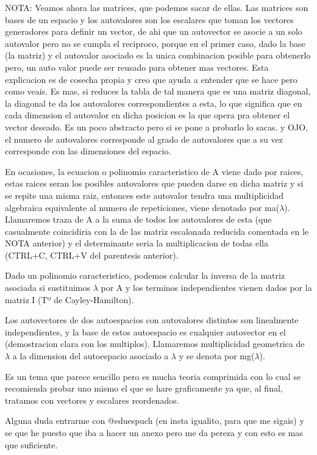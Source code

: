 \documentclass[11pt,a4paper]{article}
\begin{document}
NOTA: Veamos ahora las matrices, que podemos sacar de ellas. Las matrices son bases de un espacio y los autovalores son los escalares que toman los vectores generadores para definir un vector, de ahi que un autovector se asocie a un solo autovalor pero no se cumpla el reciproco, porque en el primer caso, dado la base (la matriz) y el autovalor asociado es la unica combinacion posible para obtenerlo pero, un auto valor puede ser reusado para obtener mas vectores. Esta explicacion es de cosecha propia y creo que ayuda a entender que se hace pero como veais. Es mas, si reduces la tabla de tal manera que es una matriz diagonal, la diagonal te da los autovalores correspondientes a esta, lo que significa que en cada dimension el autovalor en dicha posicion es la que opera pra obtener el vector deseado. Es un poco abstracto pero si se pone a probarlo lo sacas. y OJO, el numero de autovalores corresponde al grado de autovalores que a su vez corresponde con las dimensiones del espacio.

En ocasiones, la ecuacion o polinomio caracteristico de A viene dado por raices, estas raices seran los posibles autovalores que pueden darse en dicha matriz y si se repite una misma raiz, entonces este autovalor tendra una multiplicidad algebraica equivalente al numero de repeticiones, viene denotado por ma($\lambda$). Llamaremos traza de A a la suma de todos los autovalores de esta (que casualmente coincidiria con la de las matriz escalonada reducida comentada en le NOTA anterior) y el determinante seria la multiplicacion de todas ella (CTRL+C, CTRL+V del parentesis anterior).

Dado un polinomio caracteristico, podemos calcular la inversa de la matriz asociada si sustituimos $\lambda$ por A y los terminos independientes vienen dados por la matriz I (Tº de Cayley-Hamilton).

 Los autovectores de dos autoespacios con autovalores distintos son linealmente independientes, y la base de estos autoespacio es cualquier autovector en el (demostracion clara con los multiplos). Llamaremos multiplicidad geometrica de $\lambda$ a la dimension del autoespacio asociado a $\lambda$ y se denota por mg($\lambda$). 
 
 Es un tema que parece sencillo pero es mucha teoria comprimida con lo cual se recomienda probar uno mismo el que se hare graficamente ya que, al final, tratamos con vectores y escalares reordenados.
 
 Alguna duda entrarme con @eduespuch (en insta igualito, para que me sigais) y se que he puesto que iba a hacer un anexo pero me da pereza y con esto es mas que suficiente.
\end{document}
